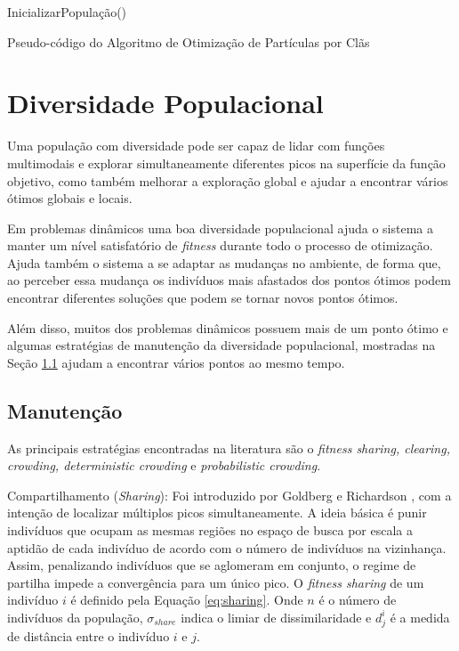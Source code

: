 \begin{algorithm}
	\label{alg:cpso_pseudocode}
	InicializarPopulação()\;
	\caption{Pseudo-código do Algoritmo de Otimização de Partículas por Clãs}
\end{algorithm}

\section{Diversidade Populacional}
\label{sec:population_diversity}

Uma população com diversidade pode ser capaz de lidar com funções multimodais e explorar simultaneamente diferentes picos na superfície da função objetivo, como também melhorar a exploração global e ajudar a encontrar vários ótimos globais e locais.

Em problemas dinâmicos uma boa diversidade populacional ajuda o sistema a manter um nível satisfatório de \textit{fitness} durante todo o processo de otimização. Ajuda também o sistema a se adaptar as mudanças no ambiente, de forma que, ao perceber essa mudança os indivíduos mais afastados dos pontos ótimos podem encontrar diferentes soluções que podem se tornar novos pontos ótimos.

Além disso, muitos dos problemas dinâmicos possuem mais de um ponto ótimo e algumas estratégias de manutenção da diversidade populacional, mostradas na Seção \ref{sec:maintain_diversity} ajudam a encontrar vários pontos ao mesmo tempo.

\subsection{Manutenção}
\label{sec:maintain_diversity}
As principais estratégias encontradas na literatura são o \textit{fitness sharing, clearing, crowding, deterministic crowding} e \textit{probabilistic crowding}.

Compartilhamento (\textit{Sharing}): Foi introduzido por Goldberg e Richardson \cite{sharing}, com a intenção de localizar múltiplos picos simultaneamente. A ideia básica é punir indivíduos que ocupam as mesmas regiões no espaço de busca por escala a aptidão de cada indivíduo de acordo com o número de indivíduos na vizinhança. Assim, penalizando indivíduos que se aglomeram em conjunto, o regime de partilha impede a convergência para um único pico. O \textit{fitness sharing} de um indivíduo $i$ é definido pela Equação \ref{eq:sharing}. Onde $n$ é o número de indivíduos da população, $\sigma_{share}$ indica o limiar de dissimilaridade e $d_j^i$ é a medida de distância entre o indivíduo $i$ e $j$.


